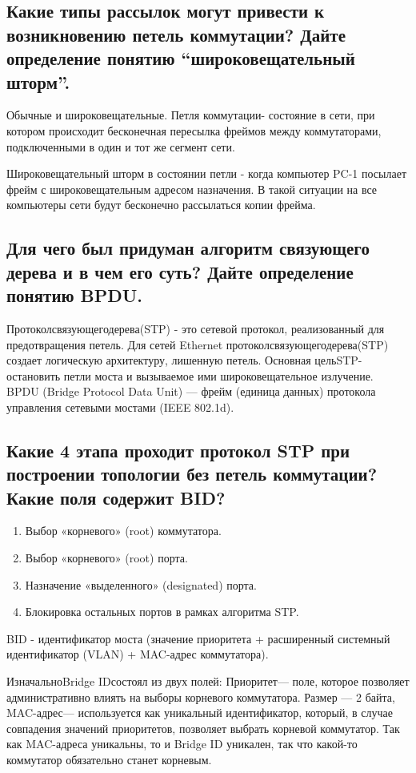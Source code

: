 \subsection{Какие типы рассылок могут привести к возникновению
петель коммутации? Дайте определение понятию “широковещательный
шторм”.}

Обычные и широковещательные.
Петля коммутации- состояние в сети, при котором происходит
бесконечная пересылка фреймов между коммутаторами, подключенными в
один и тот же сегмент сети.

Широковещательный шторм в состоянии петли - когда компьютер PC-1
посылает фрейм с широковещательным адресом назначения. В такой
ситуации на все компьютеры сети будут бесконечно рассылаться копии
фрейма.

\subsection{Для чего был придуман алгоритм связующего дерева и в чем
его суть? Дайте определение понятию BPDU.}

Протоколсвязующегодерева(STP) - это сетевой протокол,
реализованный для предотвращения петель. Для сетей Ethernet
протоколсвязующегодерева(STP) создает логическую архитектуру,
лишенную петель. Основная цельSTP- остановить петли моста и
вызываемое ими широковещательное излучение.
BPDU (Bridge Protocol Data Unit) — фрейм (единица данных)
протокола управления сетевыми мостами (IEEE 802.1d).

\subsection{Какие 4 этапа проходит протокол STP при построении
топологии без петель коммутации? Какие поля содержит BID?}

\begin{enumerate}
    \item Выбор «корневого» (root) коммутатора.
    \item Выбор «корневого» (root) порта.
    \item Назначение «выделенного» (designated) порта.
    \item Блокировка остальных портов в рамках алгоритма STP.
\end{enumerate}

BID - идентификатор моста (значение приоритета + расширенный
системный идентификатор (VLAN) + MAC-адрес коммутатора).

ИзначальноBridge IDсостоял из двух полей:
Приоритет— поле, которое позволяет административно влиять
на выборы корневого коммутатора. Размер — 2 байта,
MAC-адрес— используется как уникальный идентификатор,
который, в случае совпадения значений приоритетов, позволяет выбрать
корневой коммутатор. Так как MAC-адреса уникальны, то и Bridge ID
уникален, так что какой-то коммутатор обязательно станет корневым.


